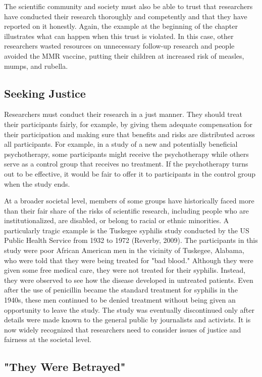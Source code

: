 The scientific community and society must also be able to trust that researchers have conducted their research thoroughly and competently and that they have reported on it honestly. Again, the example at the beginning of the chapter illustrates what can happen when this trust is violated. In this case, other researchers wasted resources on unnecessary follow-up research and people avoided the MMR vaccine, putting their children at increased risk of measles, mumps, and rubella.

\subsection{Seeking Justice}

Researchers must conduct their research in a just manner. They should treat their participants fairly, for example, by giving them adequate compensation for their participation and making sure that benefits and risks are distributed across all participants. For example, in a study of a new and potentially beneficial psychotherapy, some participants might receive the psychotherapy while others serve as a control group that receives no treatment. If the psychotherapy turns out to be effective, it would be fair to offer it to participants in the control group when the study ends.

At a broader societal level, members of some groups have historically faced more than their fair share of the risks of scientific research, including people who are institutionalized, are disabled, or belong to racial or ethnic minorities. A particularly tragic example is the Tuskegee syphilis study conducted by the US Public Health Service from 1932 to 1972 (Reverby, 2009). The participants in this study were poor African American men in the vicinity of Tuskegee, Alabama, who were told that they were being treated for "bad blood." Although they were given some free medical care, they were not treated for their syphilis. Instead, they were observed to see how the disease developed in untreated patients. Even after the use of penicillin became the standard treatment for syphilis in the 1940s, these men continued to be denied treatment without being given an opportunity to leave the study. The study was eventually discontinued only after details were made known to the general public by journalists and activists. It is now widely recognized that researchers need to consider issues of justice and fairness at the societal level.

\subsection{"They Were Betrayed"}

